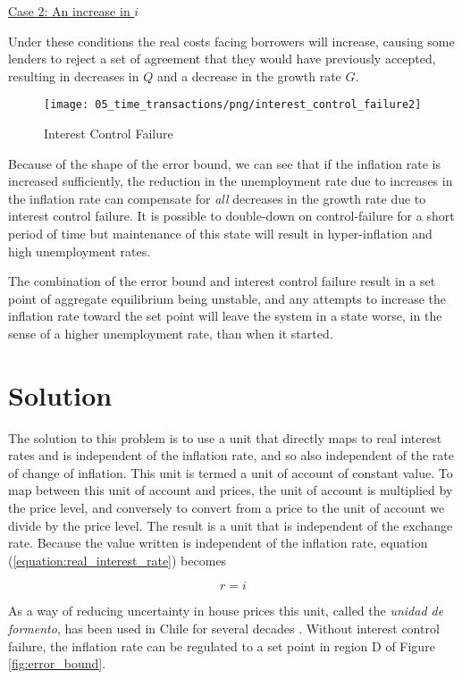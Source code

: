 \underline{Case 2: An increase in $i$} 

Under these conditions the real costs facing borrowers will increase, causing some lenders to reject
a set of agreement that they would have previously accepted, resulting in decreases in $Q$ and a
decrease in the growth rate $G$.

\begin{figure}[H]
\centering
\texttt{[image: 05\_time\_transactions/png/interest\_control\_failure2]}
\caption{Interest Control Failure}
\label{fig:interest_control_failure2}
\end{figure}

Because of the shape of the error bound, we can see that if the inflation rate is increased
sufficiently, the reduction in the unemployment rate due to increases in the inflation rate can
compensate for \emph{all} decreases in the growth rate due to interest control failure. It is
possible to double-down on control-failure for a short period of time but maintenance of this state
will result in hyper-inflation and high unemployment rates.

The combination of the error bound and interest control failure result in a set point of aggregate
equilibrium being unstable, and any attempts to increase the inflation rate toward the set point
will leave the system in a state worse, in the sense of a higher unemployment rate, than when it
started.

\section{Solution}

The solution to this problem is to use a unit that directly maps to real interest rates and is
independent of the inflation rate, and so also independent of the rate of change of inflation. This
unit is termed a unit of account of constant value. To map between this unit of account and prices,
the unit of account is multiplied by the price level, and conversely to convert from a price to the
unit of account we divide by the price level. The result is a unit that is independent of the
exchange rate. Because the value written is independent of the inflation rate, equation
(\ref{equation:real_interest_rate}) becomes

\[
    r = i
\]

As a way of reducing uncertainty in house prices this unit, called the \textit{unidad de formento},
has been used in Chile for several decades \cite{shiller1998}. Without interest control failure, the
inflation rate can be regulated to a set point in region D of Figure \ref{fig:error_bound}. 














